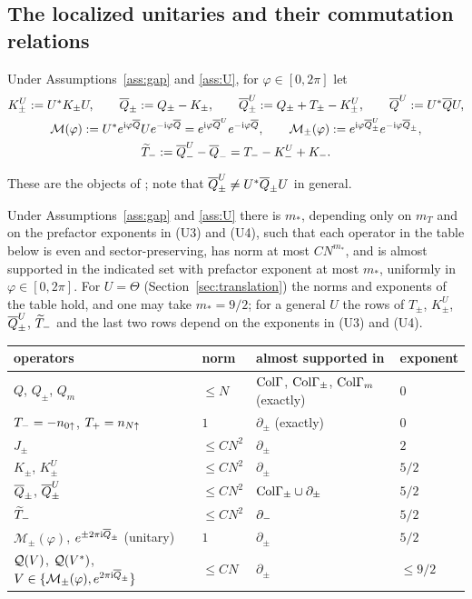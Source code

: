 \subsection{The localized unitaries and their commutation relations}

\begin{definition}\label{def:bbdfobjects}
Under Assumptions~\ref{ass:gap} and \ref{ass:U}, for $\varphi\in[0,2\pi]$ let
\begin{gather*}
K^U_\pm:=U^*K_\pm U,\qquad\overline{Q}_\pm:=Q_\pm-K_\pm,\qquad\overline{Q}^U_\pm:=Q_\pm+T_\pm-K^U_\pm,\qquad\overline{Q}^U:=U^*\overline{Q} U,\\
\mathcal M(\varphi):=U^*e^{\mathrm{i}\varphi\overline{Q}}Ue^{-\mathrm{i}\varphi\overline{Q}}=e^{\mathrm{i}\varphi\overline{Q}^U}e^{-\mathrm{i}\varphi\overline{Q}},\qquad
\mathcal M_\pm(\varphi):=e^{\mathrm{i}\varphi\overline{Q}^U_\pm}e^{-\mathrm{i}\varphi\overline{Q}_\pm},\\
\widetilde{T}_{-}:=\overline{Q}^U_--\overline{Q}_-=T_--K^U_-+K_- .
\end{gather*}
\end{definition}

These are the objects of \cite[Section~4.2]{BBDF21}; note that $\overline{Q}^U_\pm\ne U^*\overline{Q}_\pm U$ in general.

\begin{lemma}\label{lem:objects}
Under Assumptions~\ref{ass:gap} and \ref{ass:U} there is $m_*$, depending only on $m_T$ and on the prefactor
exponents in (U3) and (U4), such that each operator in the table below is even and sector-preserving, has
norm at most $CN^{m_*}$, and is almost supported in the indicated set with prefactor exponent at most $m_*$,
uniformly in $\varphi\in[0,2\pi]$. For $U=\Theta$ (Section~\ref{sec:translation}) the norms and exponents of the
table hold, and one may take $m_*=9/2$; for a general $U$ the rows of $T_\pm$, $K^U_\pm$, $\overline{Q}^U_\pm$, $\widetilde{T}_{-}$ and the last
two rows depend on the exponents in (U3) and (U4).
\begin{center}\small
\begin{tabular}{@{}llll@{}}
\toprule
operators & norm & almost supported in & exponent\\
\midrule
$Q$, $Q_\pm$, $Q_m$ & $\le N$ & $\mathrm{Col}\Gamma$, $\mathrm{Col}\Gamma_\pm$, $\mathrm{Col}\Gamma_{m}$ (exactly) & $0$\\
$T_-=-n_{0{\uparrow}}$, $T_+=n_{N{\uparrow}}$ & $1$ & $\partial_\pm$ (exactly) & $0$\\
$J_\pm$ & $\le CN^2$ & $\partial_\pm$ & $2$\\
$K_\pm$, $K^U_\pm$ & $\le CN^2$ & $\partial_\pm$ & $5/2$\\
$\overline{Q}_\pm$, $\overline{Q}^U_\pm$ & $\le CN^2$ & $\mathrm{Col}\Gamma_\pm\cup\partial_\pm$ & $5/2$\\
$\widetilde{T}_{-}$ & $\le CN^2$ & $\partial_{-}$ & $5/2$\\
$\mathcal M_\pm(\varphi)$, $e^{\pm2\pi\mathrm{i}\overline{Q}_\pm}$ (unitary) & $1$ & $\partial_\pm$ & $5/2$\\
$\mathcal{Q}(V)$, $\mathcal{Q}(V^*)$, $V\in\{\mathcal M_\pm(\varphi),e^{2\pi\mathrm{i}\overline{Q}_\pm}\}$ & $\le CN$ & $\partial_\pm$ & $\le9/2$\\
\bottomrule
\end{tabular}
\end{center}
\end{lemma}

